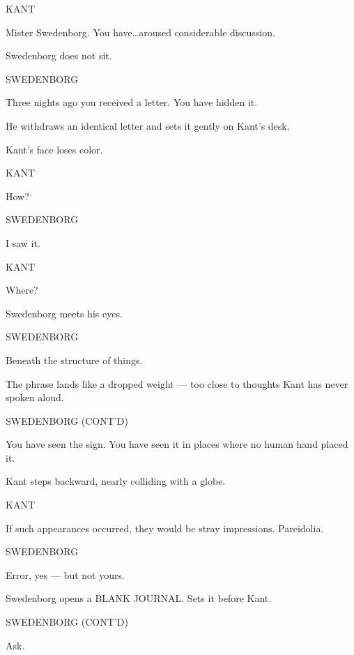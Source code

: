 \documentclass[12pt]{article}
\newenvironment{dialogue}[1]{%
  \vspace{0.8\baselineskip}%
  \noindent\hspace*{2.3in}\textsc{#1}\par%
  \noindent\hspace*{1.5in}\begin{minipage}[t]{4.5in}%
}{%
  \end{minipage}\par%
}
\begin{document}
\begin{dialogue}{KANT}
Mister Swedenborg. You have\ldots aroused considerable discussion.
\end{dialogue}

Swedenborg does not sit.

\begin{dialogue}{SWEDENBORG}
Three nights ago you received a letter. You have hidden it.
\end{dialogue}

He withdraws an identical letter and sets it gently on Kant's desk.

Kant's face loses color.

\begin{dialogue}{KANT}
How\textendash ?
\end{dialogue}

\begin{dialogue}{SWEDENBORG}
I saw it.
\end{dialogue}

\begin{dialogue}{KANT}
Where?
\end{dialogue}

Swedenborg meets his eyes.

\begin{dialogue}{SWEDENBORG}
Beneath the structure of things.
\end{dialogue}

The phrase lands like a dropped weight --- too close to thoughts Kant
has never spoken aloud.

\begin{dialogue}{SWEDENBORG (CONT'D)}
You have seen the sign. You have seen it in places where no human hand
placed it.
\end{dialogue}

Kant steps backward, nearly colliding with a globe.

\begin{dialogue}{KANT}
If such appearances occurred, they would be stray impressions. Pareidolia.
\end{dialogue}

\begin{dialogue}{SWEDENBORG}
Error, yes --- but not yours.
\end{dialogue}

Swedenborg opens a BLANK JOURNAL. Sets it before Kant.

\begin{dialogue}{SWEDENBORG (CONT'D)}
Ask.
\end{dialogue}
\end{document}
